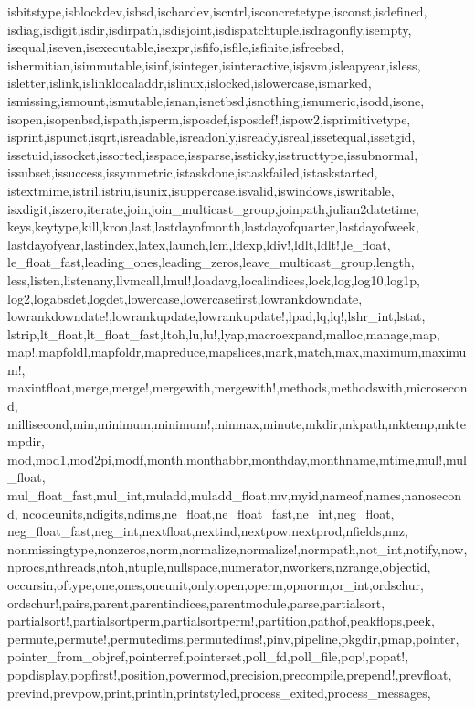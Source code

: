 {{isbitstype,isblockdev,isbsd,ischardev,iscntrl,isconcretetype,isconst,isdefined,%
isdiag,isdigit,isdir,isdirpath,isdisjoint,isdispatchtuple,isdragonfly,isempty,%
isequal,iseven,isexecutable,isexpr,isfifo,isfile,isfinite,isfreebsd,%
ishermitian,isimmutable,isinf,isinteger,isinteractive,isjsvm,isleapyear,isless,%
isletter,islink,islinklocaladdr,islinux,islocked,islowercase,ismarked,%
ismissing,ismount,ismutable,isnan,isnetbsd,isnothing,isnumeric,isodd,isone,%
isopen,isopenbsd,ispath,isperm,isposdef,isposdef!,ispow2,isprimitivetype,%
isprint,ispunct,isqrt,isreadable,isreadonly,isready,isreal,issetequal,issetgid,%
issetuid,issocket,issorted,isspace,issparse,issticky,isstructtype,issubnormal,%
issubset,issuccess,issymmetric,istaskdone,istaskfailed,istaskstarted,%
istextmime,istril,istriu,isunix,isuppercase,isvalid,iswindows,iswritable,%
isxdigit,iszero,iterate,join,join_multicast_group,joinpath,julian2datetime,%
keys,keytype,kill,kron,last,lastdayofmonth,lastdayofquarter,lastdayofweek,%
lastdayofyear,lastindex,latex,launch,lcm,ldexp,ldiv!,ldlt,ldlt!,le_float,%
le_float_fast,leading_ones,leading_zeros,leave_multicast_group,length,%
less,listen,listenany,llvmcall,lmul!,loadavg,localindices,lock,log,log10,log1p,%
log2,logabsdet,logdet,lowercase,lowercasefirst,lowrankdowndate,%
lowrankdowndate!,lowrankupdate,lowrankupdate!,lpad,lq,lq!,lshr_int,lstat,%
lstrip,lt_float,lt_float_fast,ltoh,lu,lu!,lyap,macroexpand,malloc,manage,map,%
map!,mapfoldl,mapfoldr,mapreduce,mapslices,mark,match,max,maximum,maximum!,%
maxintfloat,merge,merge!,mergewith,mergewith!,methods,methodswith,microsecond,%
millisecond,min,minimum,minimum!,minmax,minute,mkdir,mkpath,mktemp,mktempdir,%
mod,mod1,mod2pi,modf,month,monthabbr,monthday,monthname,mtime,mul!,mul_float,%
mul_float_fast,mul_int,muladd,muladd_float,mv,myid,nameof,names,nanosecond,%
ncodeunits,ndigits,ndims,ne_float,ne_float_fast,ne_int,neg_float,%
neg_float_fast,neg_int,nextfloat,nextind,nextpow,nextprod,nfields,nnz,%
nonmissingtype,nonzeros,norm,normalize,normalize!,normpath,not_int,notify,now,%
nprocs,nthreads,ntoh,ntuple,nullspace,numerator,nworkers,nzrange,objectid,%
occursin,oftype,one,ones,oneunit,only,open,operm,opnorm,or_int,ordschur,%
ordschur!,pairs,parent,parentindices,parentmodule,parse,partialsort,%
partialsort!,partialsortperm,partialsortperm!,partition,pathof,peakflops,peek,%
permute,permute!,permutedims,permutedims!,pinv,pipeline,pkgdir,pmap,pointer,%
pointer_from_objref,pointerref,pointerset,poll_fd,poll_file,pop!,popat!,%
popdisplay,popfirst!,position,powermod,precision,precompile,prepend!,prevfloat,%
prevind,prevpow,print,println,printstyled,process_exited,process_messages,%
}}

